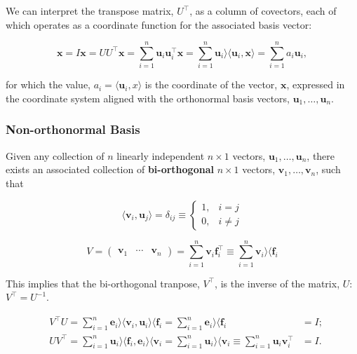 \documentclass[12pt, twoside, draft]{article}
\begin{document}
We can interpret the transpose matrix, $U^\top$, as a column of covectors, each of which operates as a coordinate function for the associated basis vector:

\begin{equation}\label{eq:basis_coordinates}
\mathbf{x} = I \mathbf{x} = UU^\top \mathbf{x} = \sum_{i=1}^n \mathbf{u}_i \mathbf{u}_i^\top \mathbf{x} = \sum_{i=1}^n \mathbf{u}_i \rangle \langle \mathbf{u}_i, \mathbf{x} \rangle = \sum_{i=1}^n a_i \mathbf{u}_i,
\end{equation}

for which the value, $a_i = \langle \mathbf{u}_i, x \rangle$ is the coordinate of the vector, $\mathbf{x}$, expressed in the coordinate system aligned with the orthonormal basis vectors, $\mathbf{u}_1, \ldots, \mathbf{u}_n$.

\subsubsection{Non-orthonormal Basis}\label{sec:non-orthonormal_bases}
Given any collection of $n$ linearly independent $n \times 1$ vectors, $\mathbf{u}_1, \ldots, \mathbf{u}_n$, there exists an associated collection of \textbf{bi-orthogonal} $n \times 1$ vectors, $\mathbf{v}_1, \ldots, \mathbf{v}_n$, such that

\begin{equation}\label{eq:bi-orthogonal_basis}
\langle \mathbf{v}_i, \mathbf{u}_j \rangle = \delta_{ij} \equiv \begin{cases} 1, & i=j \\ 0, & i\neq j \end{cases}
\end{equation}

\begin{equation}\label{eq:bi-orthogonal_basis_column_space}
V = \begin{pmatrix} \mathbf{v}_1 & \cdots & \mathbf{v}_n \end{pmatrix} = \sum_{i=1}^n \mathbf{v}_i \mathbf{f}_i^\top \equiv \sum_{i=1}^n \mathbf{v}_i \rangle \langle \mathbf{f}_i
\end{equation}

This implies that the bi-orthogonal tranpose, $V^\top$, is the inverse of the matrix, $U$: $V^\top = U^{-1}$.

\begin{align}\label{eq:bi-orthogonal_basis_inverse}
&V^\top U = \sum_{i=1}^n \mathbf{e}_i \rangle \langle \mathbf{v}_i , \mathbf{u}_i \rangle \langle \mathbf{f}_i = \sum_{i=1}^n \mathbf{e}_i \rangle \langle \mathbf{f}_i & = I; \\
&UV^\top = \sum_{i=1}^n \mathbf{u}_i \rangle \langle \mathbf{f}_i , \mathbf{e}_i \rangle \langle \mathbf{v}_i = \sum_{i=1}^n \mathbf{u}_i \rangle \langle \mathbf{v}_i \equiv \sum_{i=1}^n \mathbf{u}_i \mathbf{v}_i^\top & = I.
\end{align}
\end{document}
